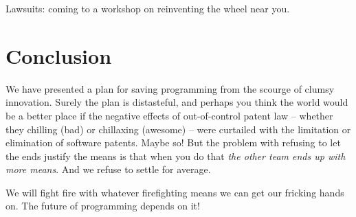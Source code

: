 \documentclass[acmtocl]%
{boviktrans}
\begin{document}
Lawsuits: coming to a workshop on reinventing the wheel near you.

\section{Conclusion}

We have presented a plan for saving programming from the scourge of
clumsy innovation. Surely the plan is distasteful, and perhaps you
think the world would be a better place if the negative effects of
out-of-control patent law -- whether they chilling (bad) or chillaxing
(awesome) -- were curtailed with the limitation or elimination of
software patents. Maybe so! But the problem with refusing to let the
ends justify the means is that when you do that {\it the other team
  ends up with more means}. And we refuse to settle for average.

We will fight fire with whatever
firefighting means we can get our fricking hands on. 
The future of programming depends on
it!
\end{document}
